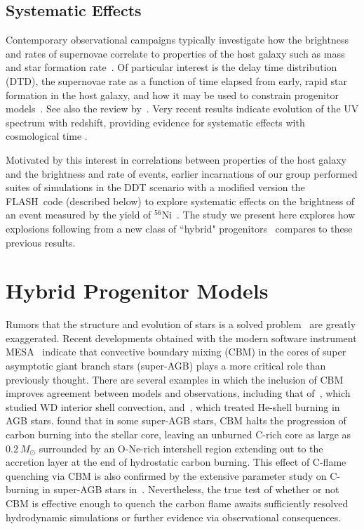\documentclass[iop,apj]{emulateapj}
\newcommand{\code}[1]{\textsc{#1}}
\newcommand{\FLASH}{\code{FLASH}}
\newcommand{\MESA}{\code{MESA}}
\newcommand{\Msun}{\ensuremath{M_\odot}}
\begin{document}
\subsection{Systematic Effects}

Contemporary observational campaigns typically investigate how
the brightness and rates of supernovae correlate to 
properties of the host galaxy such as mass and star formation
rate~\citep[c.f.][]{graurmaoz2013,graurbiancomodjaz2015}. Of
particular interest is the delay time distribution (DTD), the
supernovae rate as a function of time elapsed from 
early, rapid
star formation in the host galaxy, and how it may be used
to constrain progenitor models~\citep{hachisu:2008,
conleyetal2011,howell2011,grauretal2011,biancoetal2011,maozmannuccibrandt2012}.
See also the review by~\citet{maozmannucci2012}.
Very recent results indicate evolution of the UV spectrum with 
redshift, providing evidence for systematic effects with
cosmological time \citep{milneandfoley2015}.

Motivated by this interest in correlations between properties of the
host galaxy and the brightness and rate of events, earlier incarnations of  
our group performed suites of simulations in the DDT scenario
with a modified version the \FLASH\ code (described below) to explore
systematic effects on the brightness of an event measured by the yield of
$^{56}$Ni~\citep{Krueger2010On-Variations-o,jacketal2010,kruegetal12}. The
study we present here explores how explosions following from a new class
of ``hybrid" 
progenitors~\citep{denissenkovetal2013,chenetal2014,denissenkovetal2015} 
compares to these previous results.

\section{Hybrid Progenitor Models}\label{section:hybrid_progenitor_models}
Rumors that the structure and evolution of stars is a solved
problem~\citep{HansenEtAl04} are greatly exaggerated. Recent
developments obtained with the modern software instrument
\MESA~\citep{mesa1,mesa2,mesa3,mesa3e} indicate that convective boundary
mixing (CBM) in the cores of super asymptotic giant branch stars
(super-AGB) plays a more critical role than previously thought.  There
are several examples in which the inclusion of CBM improves agreement
between models and observations, including that
of~\citet{denissenkovetal2013}, which studied WD interior shell
convection, and~\citet{herwig2005, werner.herwig.2006}, which treated
He-shell burning in AGB stars.
\citet{denissenkovetal2013,chenetal2014} found that in some super-AGB
stars, CBM halts the progression of carbon burning into the stellar
core, leaving an unburned C-rich core as large as $0.2~\Msun$
surrounded by an O-Ne-rich intershell region extending out to the
accretion layer at the end of hydrostatic carbon burning. This effect
of C-flame quenching via CBM is also confirmed by the extensive
parameter study on C-burning in super-AGB stars
in~\citet{farmeretal2015}. Nevertheless, the true test of
  whether or not CBM is effective enough to quench the carbon flame
  awaits sufficiently resolved hydrodynamic simulations or further
  evidence via observational consequences.
  
\end{document}
